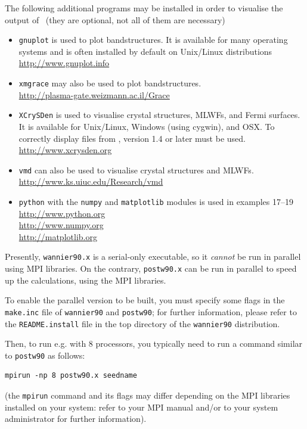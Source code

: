 \documentclass[a4paper,11pt,twoside]{article}
\begin{document}
The following additional programs may be installed in order to
visualise the output of \wannier\ (they are optional, not all of them
are necessary)
\begin{itemize}
\item {\tt gnuplot} is used to plot bandstructures. It is 
available for many operating systems and is often installed by default on
 Unix/Linux distributions\\
\url{http://www.gnuplot.info}
\item {\tt xmgrace} may also be used to plot bandstructures.\\
\url{http://plasma-gate.weizmann.ac.il/Grace}
\item {\tt XCrySDen} is used to visualise crystal structures, MLWFs,
  and Fermi surfaces. It is available for Unix/Linux, 
  Windows (using cygwin), and OSX. To correctly display 
files from \wannier, version 1.4 or later must be used.\\
\url{http://www.xcrysden.org}
\item {\tt vmd} can also be used to visualise crystal structures and
  MLWFs.\\
\url{http://www.ks.uiuc.edu/Research/vmd}
\item{\tt python} with the {\tt numpy} and {\tt matplotlib} modules
  is used in examples 17--19\\
  \url{http://www.python.org}\\
  \url{http://www.numpy.org}\\
  \url{http://matplotlib.org}
\end{itemize}

\label{sec:parallel}
Presently, {\tt wannier90.x} is a serial-only executable, so it
\emph{cannot} be run in parallel using MPI libraries. On the contrary,
{\tt postw90.x} can be run in parallel to speed up the calculations,
using the MPI libraries.

To enable the parallel version to be built, you must specify some
flags in the {\tt make.inc} file of {\tt wannier90} and {\tt postw90};
for further information, please refer to the {\tt README.install} file
in the top directory of the {\tt wannier90} distribution.

Then, to run e.g. with 8 processors, you typically need to run a
command similar to {\tt postw90} as follows:
\begin{verbatim}
mpirun -np 8 postw90.x seedname
\end{verbatim}
(the {\tt mpirun} command and its flags may differ depending on the
MPI libraries installed on your system: refer to your MPI manual and/or to
your system administrator for further information).
\end{document}
